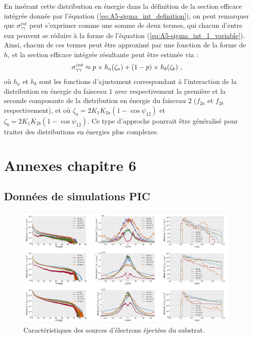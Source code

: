 En insérant cette distribution en énergie dans la définition de la section efficace intégrée donnée par l'équation (\ref{eq:A5-sigma_int_definition}), on peut remarquer que $\sigma_{\gamma\gamma}^{int}$ peut s'exprimer comme une somme de deux termes, qui chacun d'entre eux peuvent se réduire à la forme de l'équation (\ref{eq:A5-sigma_int_1_variable}). Ainsi, chacun de ces termes peut être approximé par une fonction de la forme de $h$, et la section efficace intégrée résultante peut être estimée via :
\begin{equation}
    \sigma_{\gamma\gamma}^{int} \approx p \times h_{a}(\zeta_a) + (1-p) \times h_{b}(\zeta_b) ~ \rm ,
\end{equation}
où $h_a$ et $h_b$ sont les fonctions d'ajustement correspondant à l'interaction de la distribution en énergie du faisceau $1$ avec respectivement la première et la seconde composante de la distribution en énergie du faisceau $2$ ($f_{2a}$ et $f_{2b}$ respectivement), et où $\zeta_a=2 K_1 K_{2a} (1-\cos\psi_{12})$ et $\zeta_b=2 K_1 K_{2b} (1-\cos\psi_{12})$. 
Ce type d'approche pourrait être généralisé pour traiter des distributions en énergies plus complexes.

\chapter{Annexes chapitre 6}
\section{Données de simulations PIC}
\label{an:6-PIC}

\begin{figure}[h]
    \centering
    \includegraphics[width=\linewidth]{8-annexes/absorber_electron.png}
    \caption{Caractéristiques des sources d'électrons éjectées du substrat.}
\end{figure}

